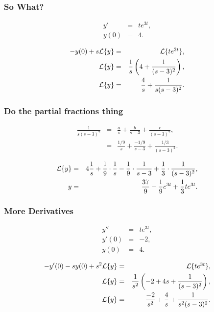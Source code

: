 \begin{frame}
  \frametitle{So What?}

  \begin{eqnarray*}
    y' & = & t e^{3t}, \\
    y(0) & = & 4.
  \end{eqnarray*}

  {
    \begin{eqnarray*}
      -y(0) + s \laplace{y} & = & \laplace{t e^{3t}}, \\
      \laplace{y} & = & \frac{1}{s} \lp 4 + \frac{1}{(s-3)^2} \rp, \\
      \laplace{y} & = & \frac{4}{s} + \frac{1}{s(s-3)^2}.
    \end{eqnarray*}
  }


\end{frame}


\begin{frame}
  \frametitle{Do the partial fractions thing}

  \begin{eqnarray*}
    \frac{1}{s(s-3)^2} & = & \frac{a}{s} + \frac{b}{s-3} + \frac{c}{(s-3)^2}, \\
    & = & \frac{1/9}{s} + \frac{-1/9}{s-3} + \frac{1/3}{(s-3)^2}.
  \end{eqnarray*}

  {
    \begin{eqnarray*}
      \laplace{y} & = & 4 \frac{1}{s} + \frac{1}{9}\cdot\frac{1}{s}  - \frac{1}{9}\cdot\frac{1}{s-3} +
      \frac{1}{3}\cdot\frac{1}{(s-3)^2}, \\
      y & = & \frac{37}{9}  - \frac{1}{9}e^{3t} + \frac{1}{3} t e^{3t}.
    \end{eqnarray*}
  }

\end{frame}


\begin{frame}
  \frametitle{More Derivatives}

  \begin{eqnarray*}
    y'' & = & t e^{3t}, \\
    y'(0) & = & -2, \\
    y(0) & = & 4.
  \end{eqnarray*}

  {
    \begin{eqnarray*}
      -y'(0) - s y(0) + s^2 \laplace{y} & = & \laplace{t e^{3t}}, \\
      \laplace{y} & = & \frac{1}{s^2} \lp -2 + 4s + \frac{1}{(s-3)^2} \rp, \\
      \laplace{y} & = & \frac{-2}{s^2} + \frac{4}{s} + \frac{1}{s^2(s-3)^2}.
    \end{eqnarray*}
  }


\end{frame}


